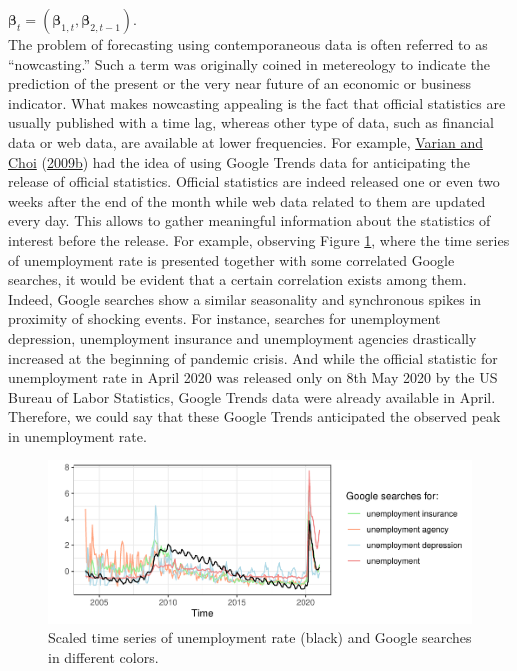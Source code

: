 \documentclass[
  12pt,
]{book}
\theoremstyle{break}
\theoremstyle{nonumberplain}
\begin{document}
\(\boldsymbol{\beta}_{t}=(\boldsymbol{\beta}_{1,t},\boldsymbol{\beta}_{2,t-1})\).\\
The problem of forecasting using contemporaneous data is often referred
to as ``nowcasting.'' Such a term was originally coined in metereology
to indicate the prediction of the present or the very near future of an
economic or business indicator. What makes nowcasting appealing is the
fact that official statistics are usually published with a time lag,
whereas other type of data, such as financial data or web data, are
available at lower frequencies. For example,
\protect\hyperlink{ref-CV_2009}{Varian and Choi}
(\protect\hyperlink{ref-CV_2009}{2009b}) had the idea of using Google
Trends data for anticipating the release of official statistics.
Official statistics are indeed released one or even two weeks after the
end of the month while web data related to them are updated every day.
This allows to gather meaningful information about the statistics of
interest before the release. For example, observing Figure
\ref{fig:myfig17}, where the time series of unemployment rate is
presented together with some correlated Google searches, it would be
evident that a certain correlation exists among them. Indeed, Google
searches show a similar seasonality and synchronous spikes in proximity
of shocking events. For instance, searches for unemployment depression,
unemployment insurance and unemployment agencies drastically increased
at the beginning of pandemic crisis. And while the official statistic
for unemployment rate in April 2020 was released only on 8th May 2020 by
the US Bureau of Labor Statistics, Google Trends data were already
available in April. Therefore, we could say that these Google Trends
anticipated the observed peak in unemployment rate.

\begin{figure}[H]

{\centering \includegraphics{Dynamic-Shrinkage-in-Bayesian-Structural-Time-Series-and-Vector-Autoregressive-Models_files/figure-latex/myfig17-1} 

}

\caption{Scaled time series of unemployment rate (black) and Google searches in different colors.}\label{fig:myfig17}
\end{figure}
\end{document}
